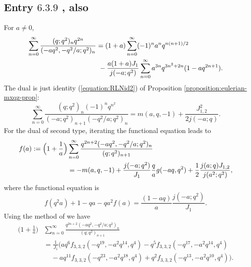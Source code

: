 \documentclass[12pt,reqno]{amsart}
\theoremstyle{remark}
\theoremstyle{definition}
\numberwithin{theorem}{section} \numberwithin{equation}{section}
\numberwithin{example}{section}
\begin{document}
{\subsection{Entry $6.3.9$ \cite{ABII}, also \cite[p. 29]{RLN}}
For $a\ne 0$,
\begin{align}
\sum_{n=0}^{\infty}\frac{(q;q^2)_{n}q^{2n}}{(-aq^2,-q^2/a;q^2)_{n}}
&=(1+a)\sum_{n=0}^{\infty}(-1)^na^{n}q^{n(n+1)/2}\label{equation:ABII-6.3.9}\\
& \ -\frac{a(1+a)J_1}{j(-a;q^2)}\sum_{n=0}^{\infty}a^{3n}q^{3n^2+2n}(1-aq^{2n+1}).\notag
\end{align}
The dual is just identity (\ref{equation:RLNid2}) of  Proposition \ref{proposition:eulerian-mxqz-prop}:
\begin{equation}
\sum_{n=0}^{\infty}\frac{(q;q^2)_{n}(-1)^nq^{n^2}}{(-a;q^2)_{n+1}(-q^2/a;q^2)_{n}}= m(a,q,-1)+\frac{J_{1,2}^2}{2j(-a;q)}.\label{equation:6.3.9-dual-final}
\end{equation}
For the dual of second type, iterating the functional equation leads to
\begin{align}
f(a):=\Big ( 1+\frac{1}{a}\Big)&\sum_{n=0}^{\infty}\frac{q^{2n+2}(-aq^2,-q^2/a;q^2)_{n}}{(q;q^2)_{n+1}}\label{equation:ABII-6.3.9-dualtypeII}\\
&=-m(a,q,-1)+\frac{j(-a;q^2)}{J_1}\frac{q}{a}g(-aq,q^2)+\frac{1}{2}\frac{j(a;q)J_{1,2}}{j(a^2;q^2)},\notag
\end{align}
where the functional equation is
\begin{equation}
f(q^2a)+1-qa-qa^2f(a)=\frac{(1-aq)}{a}\frac{j(-a;q^2)}{J_1}.\label{equation:ABII-6.3.9-func}
\end{equation}
Using the method of \cite{L} we have
\begin{align*}
\Big ( 1+\frac{1}{a}\Big)&\sum_{n=0}^{\infty}\frac{q^{2n+2}(-aq^2,-q^2/a;q^2)_{n}}{(q;q^2)_{n+1}}\\
&=\frac{1}{J_1}\Big ( aq^6f_{3,3,2}(-q^{19},-a^2q^{14},q^4)-q^5f_{3,3,2}(-q^{17},-a^2q^{14},q^4)\\
&\ \ \ \ \ -aq^{11}f_{3,3,2}(-q^{23},-a^2q^{18},q^4)+q^2f_{3,3,2}(-q^{13},-a^2q^{10},q^4)\Big).
\end{align*}

}
\end{document}
